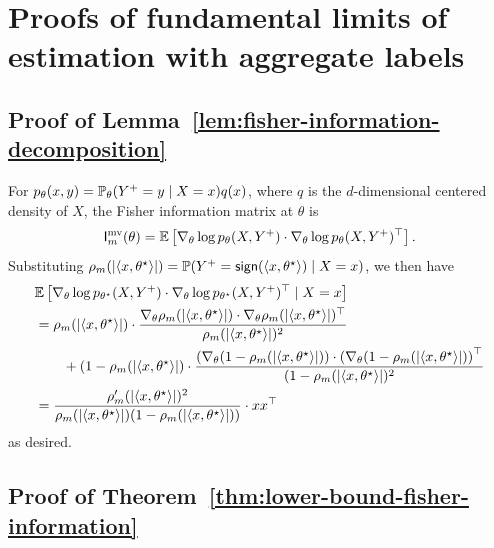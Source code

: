 \section{Proofs of fundamental limits of estimation with aggregate labels} 
\label{sec:lower-bound-supp}



\subsection{Proof of Lemma~\ref{lem:fisher-information-decomposition}} \label{proof:lem:fisher-information-decomposition}
  For $p_\theta(x, y) = \mathbb{P}_\theta(Y^+ = y \mid X = x) q(x)$, where
$q$ is the $d$-dimensional centered density of $X$,
the Fisher information matrix at $\theta$ is
\begin{align*}
	\mathsf{I}^{\textup{mv}}_m(\theta) = \mathbb{E} \left[{\nabla_\theta \log p_\theta(X, Y^+) \cdot \nabla_\theta \log p_\theta(X, Y^+)^\top }\right].
\end{align*}
Substituting $\rho_m(|\langle x, \theta^\star\rangle|) = \mathbb{P}(Y^+ =
\mathsf{sign}(\langle x, \theta^\star\rangle) \mid X = x)$, we then have
\begin{align*}
	& \mathbb{E} \left[{\nabla_\theta \log p_{\theta^\star}(X, Y^+) \cdot  \nabla_\theta \log p_{\theta^\star}(X, Y^+)^\top \mid X = x }\right] \\
	& =  \rho_m(|\langle x, \theta^\star\rangle|) \cdot \frac{\nabla_\theta \rho_m(|\langle x, \theta^\star\rangle|) \cdot \nabla_\theta \rho_m(|\langle x, \theta^\star\rangle|)^\top}{\rho_m(|\langle x, \theta^\star\rangle|)^2} \nonumber \\
	& \qquad + (1- \rho_m(|\langle x, \theta^\star\rangle|) \cdot \frac{\left({\nabla_\theta(1 - \rho_m(|\langle x, \theta^\star\rangle|)}\right) \cdot \left({\nabla_\theta(1 - \rho_m(|\langle x, \theta^\star\rangle|)}\right)^\top}{(1 - \rho_m(|\langle x, \theta^\star\rangle|)^2} \nonumber \\
	& = \frac{\rho_m'(|\langle x, \theta^\star\rangle|)^2}{\rho_m(|\langle x, \theta^\star\rangle|) ( 1 - \rho_m(|\langle x, \theta^\star\rangle|))} \cdot xx^\top
\end{align*}
as desired.


\subsection{Proof of Theorem~\ref{thm:lower-bound-fisher-information}} \label{proof:lower-bound-fisher-information}

